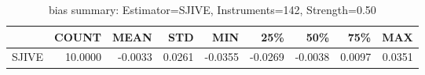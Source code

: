 \begin{table}[ht]
\centering
\caption{bias summary: Estimator=SJIVE, Instruments=142, Strength=0.50}
\begin{tabular}{lrrrrrrrr}
\toprule
 & COUNT & MEAN & STD & MIN & 25\% & 50\% & 75\% & MAX \\
\midrule
SJIVE & 10.0000 & -0.0033 & 0.0261 & -0.0355 & -0.0269 & -0.0038 & 0.0097 & 0.0351 \\
\bottomrule
\end{tabular}
\end{table}

